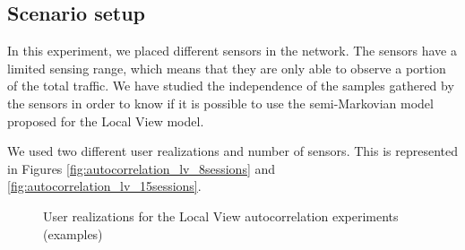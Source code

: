 \subsection{Scenario setup} \label{sec:lv_scenario_setup}
In this experiment, we placed different sensors in the network. The sensors have a limited sensing range, which means that they are only able to observe a portion of the total traffic. We have studied the independence of the samples gathered by the sensors in order to know if it is possible to use the semi-Markovian model proposed for the Local View model.

We used two different user realizations and number of sensors. This is represented in Figures \ref{fig:autocorrelation_lv_8sessions} and \ref{fig:autocorrelation_lv_15sessions}.

\begin{figure}[h!]
	\centering
	\caption{User realizations for the Local View autocorrelation experiments (examples)}
	\label{fig:autocorrelation_lv_users}
\end{figure}

